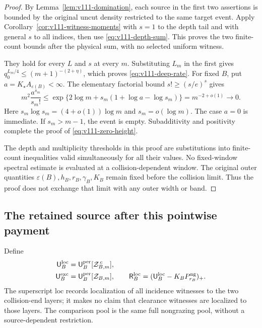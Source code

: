 \begin{proof}
By Lemma~\ref{lem:v111-domination}, each source in the first two
assertions is bounded by the original uncut density restricted to
the same target event. Apply Corollary~\ref{cor:v111-witness-moments}
with $s=1$ to the depth tail and with general $s$ to all indices,
then use \eqref{eq:v111-depth-sum}. This proves the two finite-count
bounds after the physical sum, with no selected uniform witness.

They hold for every $L$ and $s$ at every $m$. Substituting $L_m$
in the first gives
$q_0^{L_m/4}\le(m+1)^{-(2+\eta)}$, which proves
\eqref{eq:v111-deep-rate}. For fixed $B$, put
$a=K_\star A_{\varepsilon(B)}<\infty$. The elementary factorial
bound $s!\ge(s/e)^s$ gives
\[
 m^2\frac{a^{s_m}}{s_m!}
 \le\exp\{2\log m+s_m(1+\log a-\log s_m)\}
                       =m^{-2+o(1)}\longrightarrow0.
\]
Here $s_m\log s_m=(4+o(1))\log m$ and $s_m=o(\log m)$.
The case $a=0$ is immediate. If $s_m>m-1$, the event is empty.
Subadditivity and positivity complete the proof of
\eqref{eq:v111-zero-height}.

The depth and multiplicity thresholds in this proof are substitutions
into finite-count inequalities valid simultaneously for all their
values. No fixed-window spectral estimate is evaluated at a
collision-dependent window. The original outer quantities
$\varepsilon(B),h_B,r_B,\gamma_B,K_B$ remain fixed before the
collision limit. Thus the proof does not exchange that limit with
any outer width or band.
\end{proof}

\subsection{The retained source after this pointwise payment}
Define
\begin{equation}\label{eq:v111-retained-source}
 \begin{split}
 \mathsf U_B^{\rm loc}&=\mathsf U_B^{\rm per}[\mathcal Z_{B,m}^{\,c}],\\
 \mathsf U_B^{\rm exc}&=\mathsf U_B^{\rm per}[\mathcal Z_{B,m}],\qquad
 \mathsf R_B^{\rm loc}=(\mathsf U_B^{\rm loc}-K_BP_{r_B}^{\rm ng})_+.
 \end{split}
\end{equation}
The superscript $\mathrm{loc}$ records localization of all incidence
witnesses to the two collision-end layers; it makes no claim that
clearance witnesses are localized to those layers. The comparison
pool is the same full nongrazing pool, without a source-dependent
restriction.

